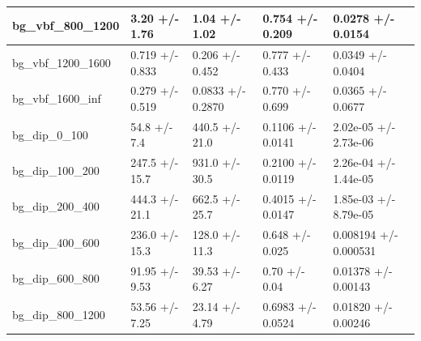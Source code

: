 \documentclass[a4paper, 10pt]{article}
\begin{document}
\begin{table}[H]
\begin{center}
\begin{tabular}{|m{20.0mm}|m{27.0mm}|m{27.0mm}|m{33.0mm}|m{32.0mm}|}
      \hline
      {\cellcolor{white}         bg\_vbf\_800\_1200}& {\cellcolor{white}         3.20 +/\-- 1.76}& {\cellcolor{white}         1.04 +/\-- 1.02}& {\cellcolor{white}         0.754 +/\-- 0.209}& {\cellcolor{white}         0.0278 +/\-- 0.0154}\\
      \hline
      {\cellcolor{white}         bg\_vbf\_1200\_1600}& {\cellcolor{white}         0.719 +/\-- 0.833}& {\cellcolor{white}         0.206 +/\-- 0.452}& {\cellcolor{white}         0.777 +/\-- 0.433}& {\cellcolor{white}         0.0349 +/\-- 0.0404}\\
      \hline
      {\cellcolor{white}         bg\_vbf\_1600\_inf}& {\cellcolor{white}         0.279 +/\-- 0.519}& {\cellcolor{white}         0.0833 +/\-- 0.2870}& {\cellcolor{white}         0.770 +/\-- 0.699}& {\cellcolor{white}         0.0365 +/\-- 0.0677}\\
      \hline
      {\cellcolor{white}         bg\_dip\_0\_100}& {\cellcolor{white}         54.8 +/\-- 7.4}& {\cellcolor{white}         440.5 +/\-- 21.0}& {\cellcolor{white}         0.1106 +/\-- 0.0141}& {\cellcolor{white}         2.02e-05 +/\-- 2.73e-06}\\
      \hline
      {\cellcolor{white}         bg\_dip\_100\_200}& {\cellcolor{white}         247.5 +/\-- 15.7}& {\cellcolor{white}         931.0 +/\-- 30.5}& {\cellcolor{white}         0.2100 +/\-- 0.0119}& {\cellcolor{white}         2.26e-04 +/\-- 1.44e-05}\\
      \hline
      {\cellcolor{white}         bg\_dip\_200\_400}& {\cellcolor{white}         444.3 +/\-- 21.1}& {\cellcolor{white}         662.5 +/\-- 25.7}& {\cellcolor{white}         0.4015 +/\-- 0.0147}& {\cellcolor{white}         1.85e-03 +/\-- 8.79e-05}\\
      \hline
      {\cellcolor{white}         bg\_dip\_400\_600}& {\cellcolor{white}         236.0 +/\-- 15.3}& {\cellcolor{white}         128.0 +/\-- 11.3}& {\cellcolor{white}         0.648 +/\-- 0.025}& {\cellcolor{white}         0.008194 +/\-- 0.000531}\\
      \hline
      {\cellcolor{white}         bg\_dip\_600\_800}& {\cellcolor{white}         91.95 +/\-- 9.53}& {\cellcolor{white}         39.53 +/\-- 6.27}& {\cellcolor{white}         0.70 +/\-- 0.04}& {\cellcolor{white}         0.01378 +/\-- 0.00143}\\
      \hline
      {\cellcolor{white}         bg\_dip\_800\_1200}& {\cellcolor{white}         53.56 +/\-- 7.25}& {\cellcolor{white}         23.14 +/\-- 4.79}& {\cellcolor{white}         0.6983 +/\-- 0.0524}& {\cellcolor{white}         0.01820 +/\-- 0.00246}\\

\end{tabular}
\end{center}
\end{table}
\end{document}
